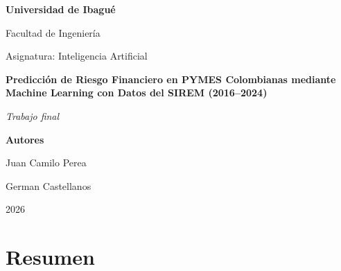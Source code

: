 \documentclass[12pt, letterpaper]{article}
\begin{document}
\begin{titlepage}
\centering
\vspace*{2cm}

{\Large\bfseries Universidad de Ibagu\'e \par}
{\large Facultad de Ingenier\'ia \par}
{\large Asignatura: Inteligencia Artificial \par}
\vspace{2cm}

{\huge\bfseries Predicci\'on de Riesgo Financiero en PYMES Colombianas mediante Machine Learning con Datos del SIREM (2016--2024) \par}

\vspace{2cm}

{\Large\itshape Trabajo final \par}

\vspace{2cm}

{\large\bfseries Autores \par}
{\large Juan Camilo Perea \par}
{\large German Castellanos \par}

\vfill

{\large 2026 \par}
\end{titlepage}

\section*{Resumen}
\end{document}
